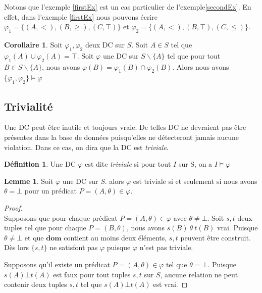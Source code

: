 \documentclass[letterpaper, 12pt]{report}
\theoremstyle{definition}
\newtheorem{mydef}{Définition}
\newtheorem{mylemma}{Lemme}
\newtheorem{mycorollaire}{Corollaire}
\newcommand{\dom}{\mathbf{dom}}
\newcommand{\alinea}{
\hspace*{0.5cm}}
\begin{document}
Notons que l'exemple \ref{firstEx} est un cas particulier de l'exemple\ref{secondEx}. En effet, dans l'exemple \ref{firstEx} nous pouvons écrire $\varphi_1 = \{(A,<),(B,\geq),(C,\top)  \}$ et $\varphi_2 = \{(A,<),(B,\top),(C,\leq)  \}$.\\

\begin{mycorollaire}
Soit $\varphi_1,\varphi_2$ deux DC sur $S$. Soit $A \in S$ tel que $\varphi_1(A)\cup\varphi_2(A) = \top$. Soit $\varphi$ une DC sur $S \backslash \{ A\}$ tel que pour tout $B \in S \backslash \{ A\}$, nous avons $\varphi(B) = \varphi_1(B) \cap \varphi_2(B)$. Alors nous avons $\{\varphi_1,\varphi_2 \} \models \varphi$
\end{mycorollaire}

\subsection{Trivialité}

Une DC peut être inutile et toujours vraie. De telles DC ne devraient pas être présentes dans la base de données puisqu'elles ne détecteront jamais aucune violation. Dans ce cas, on dira que la DC est \emph{triviale}. 
\begin{mydef}
	Une DC $\varphi$ est dite \emph{triviale} si pour tout $I$ sur S, on a $I \models \varphi$
\end{mydef}

\begin{mylemma} \label{trivialLemma}
Soit $\varphi$ une DC sur $S$. alors $\varphi$ est triviale si et seulement si nous avons $\theta = \bot$ pour un prédicat $P=(A,\theta) \in \varphi$.
\end{mylemma}
\begin{proof}
~\\
\alinea \framebox{$\implies$}
Supposons que pour chaque prédicat $P=(A,\theta) \in \varphi$ avec $\theta \neq \bot$. Soit $s,t$ deux tuples tel que pour chaque $P=(B,\theta)$, nous avons $s(B)\ \theta\ t(B)$ vrai.
Puisque $\theta \neq \bot$ et que $\dom$ contient au moins deux éléments, $s,t$ peuvent être construit. Dès lors $\{s,t\}$ ne satisfont pas $\varphi$ puisque $\varphi$ n'est pas triviale.

\framebox{$\impliedby$}
Supposons qu'il existe un prédicat $P=(A,\theta) \in \varphi$ tel que $\theta = \bot$.
Puisque $s(A) \bot t(A)$ est faux pour tout tuples $s,t$ sur $S$, aucune relation ne peut contenir deux tuples $s,t$ tel que $s(A) \bot t(A)$ est vrai.
\end{proof}
\end{document}

